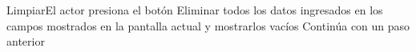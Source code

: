 
\begin{UCtrayectoriaA}{Limpiar}{El actor presiona el botón }
			\UCpaso[\UCsist] Eliminar todos los datos ingresados en los campos mostrados en la pantalla actual y mostrarlos vacíos
			\UCpaso[\UCsist] Continúa con un paso anterior
\end{UCtrayectoriaA}
